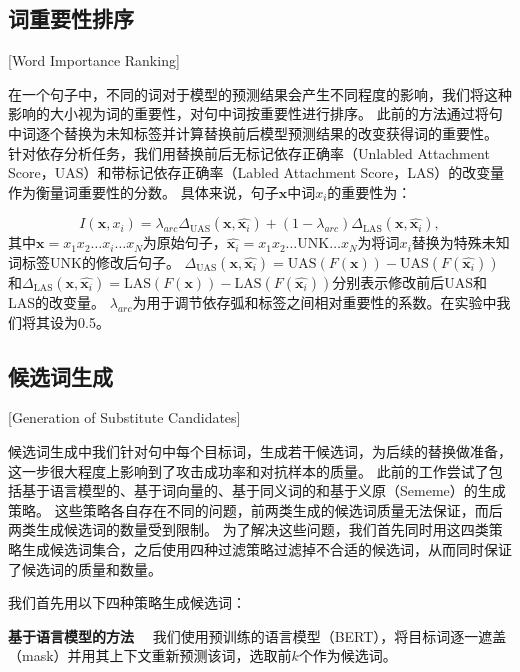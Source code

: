 \subsection{词重要性排序}[Word Importance Ranking]

在一个句子中，不同的词对于模型的预测结果会产生不同程度的影响，我们将这种影响的大小视为词的重要性，对句中词按重要性进行排序。
此前的方法通过将句中词逐个替换为未知标签并计算替换前后模型预测结果的改变获得词的重要性。\cite{li2016visualizing,ren2019generating}
针对依存分析任务，我们用替换前后无标记依存正确率（Unlabled Attachment Score，UAS）和带标记依存正确率（Labled Attachment Score，LAS）的改变量作为衡量词重要性的分数。
具体来说，句子$\bm{x}$中词$x_i$的重要性为：

\begin{equation}
	\label{eq:word-importance}
	I(\bm{x},x_i) = \lambda_{arc}\Delta_\text{UAS}(\bm{x},\hat{\bm{x}_i}) + (1-\lambda_{arc})\Delta_\text{LAS}(\bm{x},\hat{\bm{x}_i}),
\end{equation}
其中$\bm{x} = x_1x_2\dots x_i\dots x_N$为原始句子，$\hat{\bm{x}_i} = x_1x_2\dots \text{UNK}\dots x_N$为将词$x_i$替换为特殊未知词标签UNK的修改后句子。
$\Delta_\text{UAS}(\bm{x},\hat{\bm{x}_i}) = \text{UAS}(F(\bm{x})) - \text{UAS}(F(\hat{\bm{x}_i})) $和$\Delta_\text{LAS}(\bm{x},\hat{\bm{x}_i}) = \text{LAS}(F(\bm{x})) - \text{LAS}(F(\hat{\bm{x}_i}))$分别表示修改前后UAS和LAS的改变量。
$\lambda_{arc}$为用于调节依存弧和标签之间相对重要性的系数。在实验中我们将其设为0.5。


\subsection{候选词生成}[Generation of Substitute Candidates]
\label{sec:gen-cand}

候选词生成中我们针对句中每个目标词，生成若干候选词，为后续的替换做准备，这一步很大程度上影响到了攻击成功率和对抗样本的质量。
此前的工作尝试了包括基于语言模型的\cite{zheng2020evaluating}、基于词向量的\cite{alzantot2018generating}、基于同义词的\cite{ren2019generating}和基于义原（Sememe）的\cite{zang2020word}生成策略。
这些策略各自存在不同的问题，前两类生成的候选词质量无法保证，而后两类生成候选词的数量受到限制。
为了解决这些问题，我们首先同时用这四类策略生成候选词集合，之后使用四种过滤策略过滤掉不合适的候选词，从而同时保证了候选词的质量和数量。

我们首先用以下四种策略生成候选词：

\textbf{基于语言模型的方法} \ \ 我们使用预训练的语言模型（BERT），将目标词逐一遮盖（mask）并用其上下文重新预测该词，选取前$k$个作为候选词。


